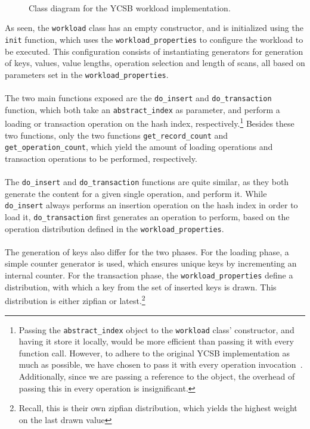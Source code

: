 \documentclass[11pt]{report} %
\begin{document}
\begin{figure}[H]
  \centering
  \\
  \caption{Class diagram for the YCSB workload implementation.}\label{fig:UML_workload}
\end{figure}
\noindent
As seen, the \verb|workload| class has an empty constructor, and is initialized using the \verb|init| function, which uses the \verb|workload_properties| to configure the workload to be executed. This configuration consists of instantiating generators for generation of keys, values, value lengths, operation selection and length of scans, all based on parameters set in the \verb|workload_properties|. \\ 
\\
The two main functions exposed are the \verb|do_insert| and \verb|do_transaction| function, which both take an \verb|abstract_index| as parameter, and perform a loading or transaction operation on the hash index, respectively.\footnote{Passing the \verb|abstract_index| object to the \verb|workload| class' constructor, and having it store it locally, would be more efficient than passing it with every function call. However, to adhere to the original YCSB implementation as much as possible, we have chosen to pass it with every operation invocation~\cite{BCycsb}. Additionally, since we are passing a reference to the object, the overhead of passing this in every operation is insignificant.} Besides these two functions, only the two functions \verb|get_record_count| and \verb|get_operation_count|, which yield the amount of loading operations and transaction operations to be performed, respectively. \\
\\
The \verb|do_insert| and \verb|do_transaction| functions are quite similar, as they both generate the content for a given single operation, and perform it. While \verb|do_insert| always performs an insertion operation on the hash index in order to load it, \verb|do_transaction| first generates an operation to perform, based on the operation distribution defined in the \verb|workload_properties|. \\
\\
The generation of keys also differ for the two phases. For the loading phase, a simple counter generator is used, which ensures unique keys by incrementing an internal counter. For the transaction phase, the \verb|workload_properties| define a distribution, with which a key from the set of inserted keys is drawn. This distribution is either zipfian or latest.\footnote{Recall, this is their own zipfian distribution, which yields the highest weight on the last drawn value} \\
\end{document}
